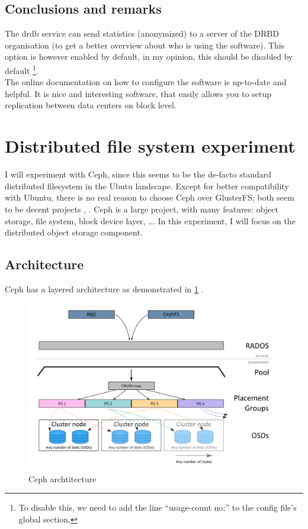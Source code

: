 \documentclass[12pt]{report}
\begin{document}
\subsection{Conclusions and remarks}
The drdb service can send statistics (anonymized) to a
server of the DRBD organisation (to get a better overview about who is
using the software). This option is however enabled by
default, in my opinion, this should be disabled by default
\footnote{To disable this, we need to add the line ``usage-count no;''
  to the config file's global section.}.\\
The online documentation on how to configure the software is
up-to-date and helpful. It is nice and interesting software, that easily allows you
to setup replication between data centers on block level.

\section{Distributed file system experiment}
I will experiment with Ceph, since this seems to be the de-facto
standard distributed filesystem in the Ubutu landscape.
Except for better compatibility with Ubuntu, there is no real reason
to choose Ceph over GlusterFS; both seem to be decent projects
\cite{ceph_vs_gluster_1}, \cite{ceph_vs_gluster_debate}.
Ceph is a large project, with many features: object storage, file
system, block device layer, ... In this experiment, I will focus on
the distributed object storage component.

\subsection{Architecture}
\label{subsec:ceph_architecture}
Ceph has a layered architecture as demonstrated in
\cref{fig:ceph_architecture} \cite{ceph_architecture}.

\begin{figure}[h!]
  \caption{Ceph archtitecture}
  \label{fig:ceph_architecture}
  \centering
    \includegraphics[scale=0.3]{pics/ceph_architecture.png}
\end{figure}
\end{document}
